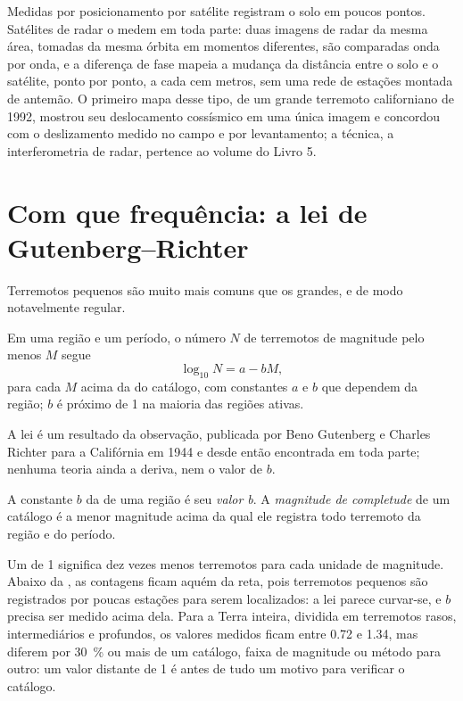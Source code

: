 Medidas por posicionamento por satélite registram o solo em poucos pontos. Satélites de radar o medem em toda parte: duas imagens de radar da mesma área, tomadas da mesma órbita em momentos diferentes, são comparadas onda por onda, e a diferença de fase mapeia a mudança da distância entre o solo e o satélite, ponto por ponto, a cada cem metros, sem uma rede de estações montada de antemão. O primeiro mapa desse tipo, de um grande terremoto californiano de 1992, mostrou seu deslocamento cossísmico em uma única imagem e concordou com o deslizamento medido no campo e por levantamento; a técnica, a interferometria de radar, pertence ao volume do Livro 5.

\section{Com que frequência: a lei de Gutenberg--Richter}\label{sec:b1:earthquake-source:gr}

Terremotos pequenos são muito mais comuns que os grandes, e de modo notavelmente regular.

\begin{proposition}\label{prop:b1:earthquake-source:gutenberg-richter}
Em uma região e um período, o número $N$ de terremotos de magnitude pelo menos
$M$ segue
\[
  \log_{10} N = a - bM ,
\]
para cada $M$ acima da  do catálogo, com constantes $a$ e $b$ que dependem da região; $b$ é próximo de 1 na maioria das regiões ativas.
\end{proposition}
\admitted

A lei é um resultado da observação, publicada por Beno Gutenberg e Charles Richter para a Califórnia em 1944 e desde então encontrada em toda parte; nenhuma teoria ainda a deriva, nem o valor de $b$.

\begin{definition}\label{def:b1:earthquake-source:b-value}
A constante $b$ da  de uma região é seu \emph{valor b}. A \emph{magnitude de completude} de um catálogo é a menor magnitude acima da qual ele registra todo terremoto da região e do período.
\end{definition}

Um  de 1 significa dez vezes menos terremotos para cada unidade de magnitude. Abaixo da , as contagens ficam aquém da reta, pois terremotos pequenos são registrados por poucas estações para serem localizados: a lei parece curvar-se, e $b$ precisa ser medido acima dela. Para a Terra inteira, dividida em terremotos rasos, intermediários e profundos, os valores medidos ficam entre 0.72 e 1.34, mas diferem por \qty{30}{\percent} ou mais de um catálogo, faixa de magnitude ou método para outro: um valor distante de 1 é antes de tudo um motivo para verificar o catálogo.

